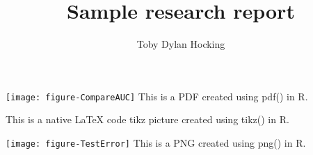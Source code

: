 \documentclass[11pt]{article}
\begin{document}
\title{Sample research report}
\author{Toby Dylan Hocking}

\maketitle

\texttt{[image: figure-CompareAUC]}
This is a PDF created using pdf() in R.


This is a native LaTeX code tikz picture created using tikz() in R.

\texttt{[image: figure-TestError]}
This is a PNG created using png() in R.
\end{document}
